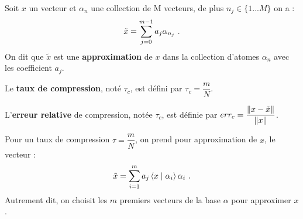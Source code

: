 \begin{defn}[Approximation]
	Soit $x$ un vecteur et $\alpha_{n}$ une collection de M vecteurs, de plus $n_{j}\in \lbrace 1 ... M \rbrace$ on a :
	\vspace{-0.15cm}$$
	\tilde{x} = \sum_{j=0}^{m-1} a_{j} \alpha_{n_{j}}\ .
	\vspace{-0.15cm}$$
	On dit que $\tilde{x}$ est une \textbf{approximation} de $x$ dans la collection d'atomes $\alpha_{n}$ avec les coefficient $a_{j}$.
\end{defn}

\begin{defn}
	Le \textbf{taux de compression}, noté $\tau_{c}$, est défini par $\tau_{c} = \dfrac{m}{N}$.
\end{defn}

\begin{defn}
	L'\textbf{erreur relative} de compression, notée $\tau_{c}$, est définie par
	$err_{c} = \dfrac{ \left\lVert x-\tilde{x}\right\rVert }{\left\lVert x\right\rVert}$.
\end{defn}

\begin{defn}
	Pour un taux de compression $\tau = \dfrac{m}{N}$, on prend pour approximation de $x$, le vecteur :
	\vspace{-0.15cm}$$
	\tilde{x} = \sum_{i=1}^{m} a_{j} \scal{x}{\alpha_{i}} \alpha_{i}\ .
	\vspace{-0.15cm}$$
	Autrement dit, on choisit les $m$ premiers vecteurs de la base $\alpha$ pour approximer $x$.
\end{defn}